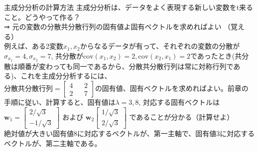 \documentclass[dvipdfmx,autodetect-engine, unicode, 10pt, aspectratio=169]{beamer}
\begin{document}
\begin{frame}{主成分分析の計算方法}
    主成分分析は、データをよく表現する新しい変数をt来ること。どうやって作る？\\
    ⇒ 元の変数の分散共分散行列の固有値よ固有ベクトルを求めればよい （覚える）\\
    例えば、ある2変数$x_1, x_2$からなるデータが有って、それぞれの変数の分散が$\sigma_{x_1}=4, \sigma_{x_2}=7$, 共分散が$\text{cov}(x_1, x_2)=2, \text{cov}(x_2, x_1)=2$であったとき(共分散は順番が変わっても同一であるから、分散共分散行列は常に対称行列である)、これを主成分分析するには、\\
    $
        \text{分散共分散行列} = 
            \begin{bmatrix}
                4 && 2 \\
                2 && 7
            \end{bmatrix}
    $の固有値、固有ベクトルを求めればよい。前章の手順に従い、計算すると、固有値は$\lambda = 3, 8$, 対応する固有ベクトルは\\
    $\bm{w}_1 = \begin{bmatrix}
        2/\sqrt{3} \\ -1/\sqrt{3}
    \end{bmatrix}$
    および
    $\bm{w}_2\begin{bmatrix}
        1/\sqrt{3} \\ 2/\sqrt{3}
    \end{bmatrix}$
    であることが分かる（計算せよ）\\
    絶対値が大きい固有値8に対応するベクトルが、第一主軸で、固有値3に対応するベクトルが、第二主軸である。
\end{frame}
\end{document}
